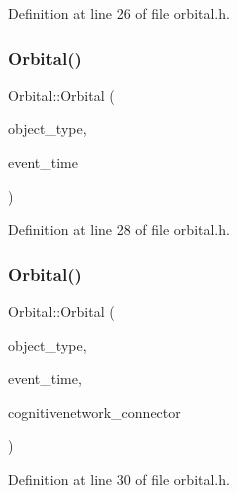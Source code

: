 Definition at line 26 of file orbital.\+h.

\mbox{\label{class_orbital_a099b2f1d77a36181fdf1820a6089a05b}} 
\subsubsection{\texorpdfstring{Orbital()}{Orbital()}\hspace{0.1cm}{\footnotesize\ttfamily [3/4]}}
{\footnotesize\ttfamily Orbital\+::\+Orbital (\begin{DoxyParamCaption}\item[{unsigned int}]{object\+\_\+type,  }\item[{std\+::chrono\+::time\+\_\+point$<$ \mbox{\hyperlink{universe_8h_a0ef8d951d1ca5ab3cfaf7ab4c7a6fd80}{Clock}} $>$}]{event\+\_\+time }\end{DoxyParamCaption})\hspace{0.3cm}{\ttfamily [inline]}}



Definition at line 28 of file orbital.\+h.

\mbox{\label{class_orbital_ac54161437f3bd23cc1e6e85e702239c8}} 
\subsubsection{\texorpdfstring{Orbital()}{Orbital()}\hspace{0.1cm}{\footnotesize\ttfamily [4/4]}}
{\footnotesize\ttfamily Orbital\+::\+Orbital (\begin{DoxyParamCaption}\item[{unsigned int}]{object\+\_\+type,  }\item[{std\+::chrono\+::time\+\_\+point$<$ \mbox{\hyperlink{universe_8h_a0ef8d951d1ca5ab3cfaf7ab4c7a6fd80}{Clock}} $>$}]{event\+\_\+time,  }\item[{\mbox{\hyperlink{class_cognitive_network}{Cognitive\+Network}} \&}]{cognitivenetwork\+\_\+connector }\end{DoxyParamCaption})\hspace{0.3cm}{\ttfamily [inline]}}



Definition at line 30 of file orbital.\+h.

